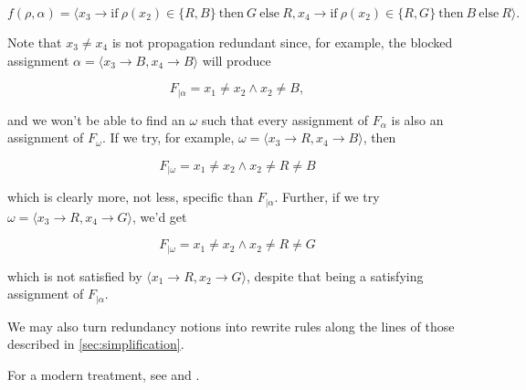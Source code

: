 \begin{equation}
  f(\rho, \alpha) = \langle x_3 \rightarrow \text{if}\ \rho(x_2) \in \{R, B\}\ \text{then}\ G\ \text{else}\ R, x_4 \rightarrow \text{if}\ \rho(x_2) \in \{R, G\}\ \text{then}\ B\ \text{else}\ R \rangle.    
\end{equation}

Note that $x_3 \neq x_4$ is not propagation redundant since, for example, the blocked assignment $\alpha = \langle x_3 \rightarrow B, x_4 \rightarrow B\rangle$ will produce

\begin{equation}
    F_{|\alpha} = x_1 \neq x_2 \wedge x_2 \neq B,
\end{equation}

and we won't be able to find an $\omega$ such that every assignment of $F_{\alpha}$ is also an assignment of $F_{\omega}$. If we try, for example, $\omega = \langle x_3 \rightarrow R, x_4 \rightarrow B\rangle$, then

\begin{equation}
    F_{|\omega} = x_1 \neq x_2 \wedge x_2 \neq R \neq B
\end{equation}

which is clearly more, not less, specific than $F_{|\alpha}$. Further, if we try $\omega = \langle x_3 \rightarrow R, x_4 \rightarrow G\rangle$, we'd get

\begin{equation}
    F_{|\omega} = x_1 \neq x_2 \wedge x_2 \neq R \neq G
\end{equation}

which is not satisfied by $\langle x_1 \rightarrow R, x_2 \rightarrow G\rangle$, despite that being a satisfying assignment of $F_{|\alpha}$.

We may also turn redundancy notions into rewrite rules along the lines of those described in \ref{sec:simplification}.

For a modern treatment, see \citep{heule2017short} and \citep{barnett2021non}.




